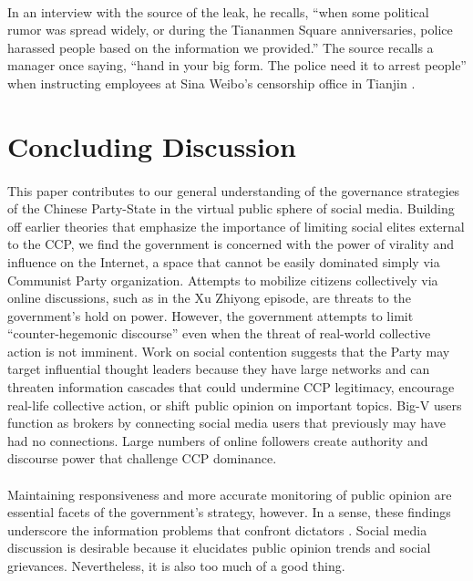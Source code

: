 \documentclass[12pt]{article}
\begin{document}
\begin{CJK*}{UTF8}{gbsn}
\paragraph{} In an interview with the source of the leak, he recalls, ``when some political rumor was spread widely, or during the Tiananmen Square anniversaries, police harassed people based on the information we provided.'' The source recalls a manager once saying, ``hand in your big form. The police need it to arrest people'' when instructing employees at Sina Weibo's censorship office in Tianjin \citep{wang2016read,wang2016business}.

\section{Concluding Discussion}

\paragraph{} This paper contributes to our general understanding of the governance strategies of the Chinese Party-State in the virtual public sphere of social media. Building off earlier theories that emphasize the importance of limiting social elites external to the CCP, we find the government is concerned with the power of virality and influence on the Internet, a space that cannot be easily dominated simply via Communist Party organization. Attempts to mobilize citizens collectively via online discussions, such as in the Xu Zhiyong episode, are threats to the government's hold on power. However, the government attempts to limit ``counter-hegemonic discourse'' even when the threat of real-world collective action is not imminent. Work on social contention suggests that the Party may target influential thought leaders because they have large networks and can threaten information cascades that could undermine CCP legitimacy, encourage real-life collective action, or shift public opinion on important topics. Big-V users function as brokers by connecting social media users that previously may have had no connections. Large numbers of online followers create authority and discourse power that challenge CCP dominance.
\paragraph{} Maintaining responsiveness and more accurate monitoring of public opinion are essential facets of the government's strategy, however. In a sense, these findings underscore the information problems that confront dictators \citep{wintrobe2000political}. Social media discussion is desirable because it elucidates public opinion trends and social grievances. Nevertheless, it is also too much of a good thing.

\end{CJK*}
\end{document}
